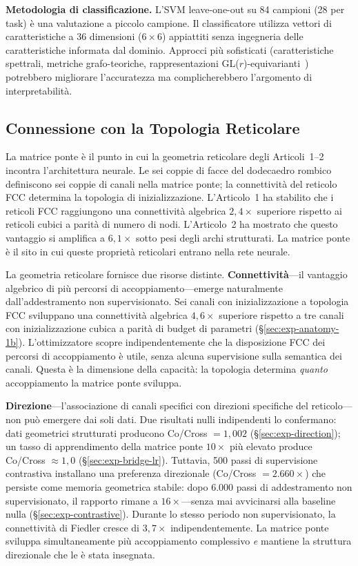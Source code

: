 \documentclass[11pt]{article}
\begin{document}
\textbf{Metodologia di classificazione.} L'SVM leave-one-out su 84
campioni (28 per task) \`e una valutazione a piccolo campione. Il
classificatore utilizza vettori di caratteristiche a 36 dimensioni
($6 \times 6$) appiattiti senza ingegneria delle caratteristiche
informata dal dominio. Approcci pi\`u sofisticati (caratteristiche
spettrali, metriche grafo-teoriche, rappresentazioni
GL($r$)-equivarianti~\cite{putterman2024learning}) potrebbero migliorare
l'accuratezza ma complicherebbero l'argomento di interpretabilit\`a.

\subsection{Connessione con la Topologia Reticolare}
\label{sec:lattice-connection}

La matrice ponte \`e il punto in cui la geometria reticolare degli
Articoli~1--2~\cite{rhombilora_paper1, rhombilora_paper2} incontra
l'architettura neurale. Le sei coppie di facce del dodecaedro rombico
definiscono sei coppie di canali nella matrice ponte; la connettivit\`a
del reticolo FCC determina la topologia di inizializzazione.
L'Articolo~1 ha stabilito che i reticoli FCC raggiungono una
connettivit\`a algebrica $2{,}4\times$ superiore rispetto ai reticoli
cubici a parit\`a di numero di nodi. L'Articolo~2 ha mostrato che
questo vantaggio si amplifica a $6{,}1\times$ sotto pesi degli archi
strutturati. La matrice ponte \`e il sito in cui queste propriet\`a
reticolari entrano nella rete neurale.

La geometria reticolare fornisce due risorse distinte.
\textbf{Connettivit\`a}---il vantaggio algebrico di pi\`u percorsi di
accoppiamento---emerge naturalmente dall'addestramento non
supervisionato. Sei canali con inizializzazione a topologia FCC
sviluppano una connettivit\`a algebrica $4{,}6\times$ superiore rispetto
a tre canali con inizializzazione cubica a parit\`a di budget di
parametri (\S\ref{sec:exp-anatomy-1b}).
L'ottimizzatore scopre indipendentemente che la disposizione FCC dei
percorsi di accoppiamento \`e utile, senza alcuna supervisione sulla
semantica dei canali. Questa \`e la dimensione della capacit\`a: la
topologia determina \emph{quanto} accoppiamento la matrice ponte
sviluppa.

\textbf{Direzione}---l'associazione di canali specifici con direzioni
specifiche del reticolo---non pu\`o emergere dai soli dati. Due
risultati nulli indipendenti lo confermano: dati geometrici strutturati
producono Co/Cross $= 1{,}002$ (\S\ref{sec:exp-direction}); un tasso di
apprendimento della matrice ponte $10\times$ pi\`u elevato produce
Co/Cross $\approx 1{,}0$ (\S\ref{sec:exp-bridge-lr}). Tuttavia, 500
passi di supervisione contrastiva installano una preferenza direzionale
(Co/Cross $= 2.660\times$) che persiste come memoria geometrica stabile:
dopo 6.000 passi di addestramento non supervisionato, il rapporto rimane
a $16\times$---senza mai avvicinarsi alla baseline nulla
(\S\ref{sec:exp-contrastive}). Durante lo stesso periodo non
supervisionato, la connettivit\`a di Fiedler cresce di $3{,}7\times$
indipendentemente. La matrice ponte sviluppa simultaneamente pi\`u
accoppiamento complessivo \emph{e} mantiene la struttura direzionale che
le \`e stata insegnata.
\end{document}
